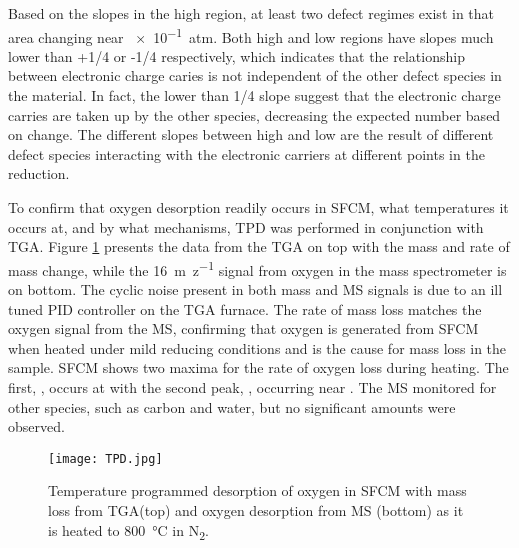     Based on the slopes in the high  region, at least two defect regimes exist in that area changing near \SI{e-1}{atm}.
    Both high and low  regions have slopes much lower than +1/4 or -1/4 respectively, which indicates that the relationship between electronic charge caries is not independent of the other defect species in the material.
    In fact, the lower than 1/4 slope suggest that the electronic charge carries are taken up by the other species, decreasing the expected number based on  change.
    The different slopes between high and low  are the result of different defect species interacting with the electronic carriers at different points in the reduction.

    To confirm that oxygen desorption readily occurs in SFCM, what temperatures it occurs at, and by what mechanisms, TPD was performed in conjunction with TGA.
    Figure \ref{fig:TPD} presents the data from the TGA on top with the mass and rate of mass change, while the \SI{16}{m\per z} signal from oxygen in the mass spectrometer is on bottom.
    The cyclic noise present in both mass and MS signals is due to an ill tuned PID controller on the TGA furnace.
    The rate of mass loss matches the oxygen signal from the MS, confirming that oxygen is generated from SFCM when heated under mild reducing conditions and is the cause for mass loss in the sample.
    SFCM shows two maxima for the rate of oxygen loss during heating.
    The first, \textalpha, occurs at  with the second peak, \textbeta, occurring near .
    The MS monitored for other species, such as carbon and water, but no significant amounts were observed.

    \begin{figure}
      \texttt{[image: TPD.jpg]}
      \caption{Temperature programmed desorption of oxygen in SFCM with mass loss from TGA(top) and oxygen desorption from MS (bottom) as it is heated to \SI{800}{\celsius} in N\textsubscript{2}.}
      \label{fig:TPD}
    \end{figure}

